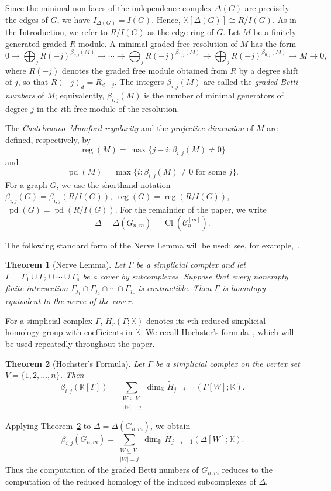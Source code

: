 \documentclass[12pt,reqno]{amsart}
\newtheorem{theorem}{Theorem}[section]
\theoremstyle{definition}
\numberwithin{equation}{section}
\def\C{\mathcal{C}}
\def\K{\mathbb{K}}
\newcommand{\pd}{\operatorname{pd}}
\newcommand{\reg}{\operatorname{reg}}
\begin{document}
Since the minimal non-faces of the independence complex $\Delta(G)$ are
precisely the edges of $G$, we have \( I_{\Delta(G)}=I(G). \) 
Hence, \( \K[\Delta(G)]\cong R/I(G). \)
As in the Introduction, we refer to $R/I(G)$ as the edge ring of $G$.
 Let $M$ be a finitely generated graded $R$-module. A minimal graded
free resolution of $M$ has the form
\[
0\longrightarrow
\bigoplus_j R(-j)^{\beta_{p,j}(M)}
\longrightarrow\cdots\longrightarrow
\bigoplus_j R(-j)^{\beta_{1,j}(M)}
\longrightarrow
\bigoplus_j R(-j)^{\beta_{0,j}(M)}
\longrightarrow M\longrightarrow0,
\]
where $R(-j)$ denotes the graded free module obtained from $R$ by a
degree shift of $j$, so that $R(-j)_d=R_{d-j}$. The integers
$\beta_{i,j}(M)$ are called the \emph{graded Betti numbers} of $M$;
equivalently, $\beta_{i,j}(M)$ is the number of minimal generators of
degree $j$ in the $i$th free module of the resolution.

The \emph{Castelnuovo--Mumford regularity} and the
\emph{projective dimension} of $M$ are defined, respectively, by
\[
\reg(M)=\max\{j-i:\beta_{i,j}(M)\neq0\}
\]
and
\[
\pd(M)=\max\{i:\beta_{i,j}(M)\neq0
\text{ for some }j\}.
\]
For a graph $G$, we use the shorthand notation \( \beta_{i,j}(G)=\beta_{i,j}(R/I(G)),
~\reg(G)=\reg(R/I(G))\), \(
~\pd(G)=\pd(R/I(G)). \)
For the remainder of the paper, we write
\[
\Delta=\Delta(G_{n,m})
=\operatorname{Cl}(\C_n^{[m]}).
\]

The following standard form of the Nerve Lemma will be used; see,
for example,~\cite{Kozlov}.
\begin{theorem}[Nerve Lemma]\label{thm:nerve}
	Let $\Gamma$ be a simplicial complex and let
	\( \Gamma=\Gamma_1\cup\Gamma_2\cup\cdots\cup\Gamma_s \)
	be a cover by subcomplexes. Suppose that every nonempty finite
	intersection \( \Gamma_{j_1}\cap\Gamma_{j_2}\cap\cdots\cap\Gamma_{j_r} \)
	is contractible. Then $\Gamma$ is homotopy equivalent to the nerve of
	the cover.
\end{theorem}

For a simplicial complex $\Gamma$,
$\widetilde H_r(\Gamma;\K)$ denotes its $r$th reduced simplicial
homology group with coefficients in $\K$. We recall Hochster's formula~\cite{hoch},
which will be used repeatedly throughout the paper.

\begin{theorem}[Hochster's Formula]\label{hochster}
	Let $\Gamma$ be a simplicial complex on the vertex set
	$V=\{1,2,\ldots,n\}$. Then
	\[
	\beta_{i,j}(\K[\Gamma])
	=
	\sum_{\substack{W\subseteq V\\ |W|=j}}
	\dim_{\K}\widetilde H_{j-i-1}(\Gamma[W];\K).
	\]
\end{theorem}
Applying Theorem~\ref{hochster} to
$\Delta=\Delta(G_{n,m})$, we obtain
\[
\beta_{i,j}(G_{n,m})
=
\sum_{\substack{W\subseteq V\\ |W|=j}}
\dim_{\K}
\widetilde H_{j-i-1}(\Delta[W];\K).
\]
Thus the computation of the graded Betti numbers of $G_{n,m}$ reduces to
the computation of the reduced homology of the induced subcomplexes of
$\Delta$.
\end{document}
